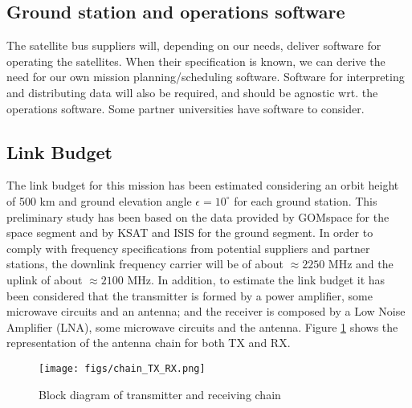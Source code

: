 %
%

\subsection{Ground station and operations software}

The satellite bus suppliers will, depending on our needs, deliver software for operating the satellites. When their specification is known, we can derive the need for our own mission planning/scheduling software. Software for interpreting and distributing data will also be required, and should be agnostic wrt. the operations software. 
Some partner universities have software to consider. 

\subsection{Link Budget}

The link budget for this mission has been estimated considering an orbit height of 500 km and ground elevation angle $\epsilon = 10^{\circ}$ for each ground station. This preliminary study has been based on the data provided by GOMspace for the space segment and by KSAT and ISIS for the ground segment. In order to comply with frequency specifications from potential suppliers and partner stations, the downlink frequency carrier will be of about $\approx 2250$ MHz and the uplink of about $ \approx 2100$ MHz. In addition, to estimate the link budget it has been considered that the transmitter is formed by a power amplifier, some microwave circuits and an antenna; and the receiver is composed by a Low Noise Amplifier (LNA), some microwave circuits and the antenna. Figure \ref{fig:chain} shows the representation of the antenna chain for both TX and RX.

\begin{figure}[htbp]
	\centering
		\texttt{[image: figs/chain\_TX\_RX.png]}
	\caption{Block diagram of transmitter and receiving chain}
	\label{fig:chain}
\end{figure}

